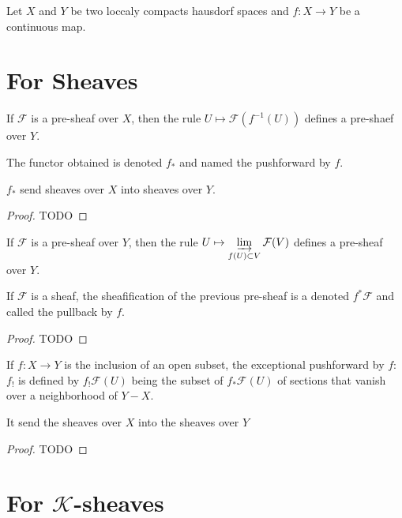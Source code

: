 Let $X$ and $Y$ be two loccaly compacts hausdorf spaces and $f:X\to Y$ be a continuous map.

\section{For Sheaves}

\begin{definition}\label{def:pushforward_of_sheaf}
    If $\mathcal{F}$ is a pre-sheaf over $X$, then the rule $U\mapsto \mathcal{F}(f^{-1}(U))$ defines a pre-shaef over $Y$.

    The functor obtained is denoted $f_*$ and named the pushforward by $f$.

    $f_*$ send sheaves over $X$ into sheaves over $Y$.
\end{definition}

\begin{proof}
    TODO
\end{proof}

\begin{definition}\label{def:pullback_of_sheaf}
    If $\mathcal{F}$ is a pre-sheaf over $Y$, then the rule $U\mapsto \varinjlim\limits_{f(U)\subset V}\mathcal{F}(V)$ defines a pre-sheaf over $Y$.

    If $\mathcal{F}$ is a sheaf, the sheafification of the previous pre-sheaf is a denoted $f^*\mathcal{F}$ and called the pullback by $f$.

\end{definition}

\begin{proof}
    TODO
\end{proof}

\begin{definition}\label{def:exceptional_pushforward_of_sheaf}
    If $f:X\to Y$ is the inclusion of an open subset, the exceptional pushforward by $f$: $f_!$ is defined by $f_!\mathcal{F}(U)$ being the subset of $f_*\mathcal{F}(U)$ of sections that vanish over a neighborhood of $Y-X$.

    It send the sheaves over $X$ into the sheaves over $Y$
\end{definition}

\begin{proof}
    TODO
\end{proof}

\section{For $\mathcal{K}$-sheaves}

